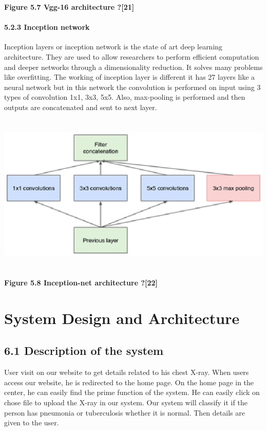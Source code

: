 \documentclass{article} %
\begin{document}
\noindent \textbf{Figure 5.7 Vgg-16 architecture ?[21]}

\noindent 
\paragraph{5.2.3 Inception network}

\noindent Inception layers or inception network is the state of art deep learning architecture. They are used to allow researchers to perform efficient computation and deeper networks through a dimensionality reduction. It solves many problems like overfitting. The working of inception layer is different it has 27 layers like a neural network but in this network the convolution is performed on input using 3 types of convolution 1x1, 3x3, 5x5. Also, max-pooling is performed and then outputs are concatenated and sent to next layer.

\noindent \includegraphics*[width=6.23in, height=3.01in, keepaspectratio=false]{image27}

\noindent \textbf{Figure 5.8 Inception-net architecture ?[22]}

\noindent \eject 

\textbf{}

\textbf{}


\section{ System Design and Architecture}

\noindent 
\subsection{6.1 Description of the system}

\noindent User visit on our website to get details related to his chest X-ray. When users access our website, he is redirected to the home page. On the home page in the center, he can easily find the prime function of the system. He can easily click on chose file to upload the X-ray in our system. Our system will classify it if the person has pneumonia or tuberculosis whether it is normal. Then details are given to the user.
\end{document}

